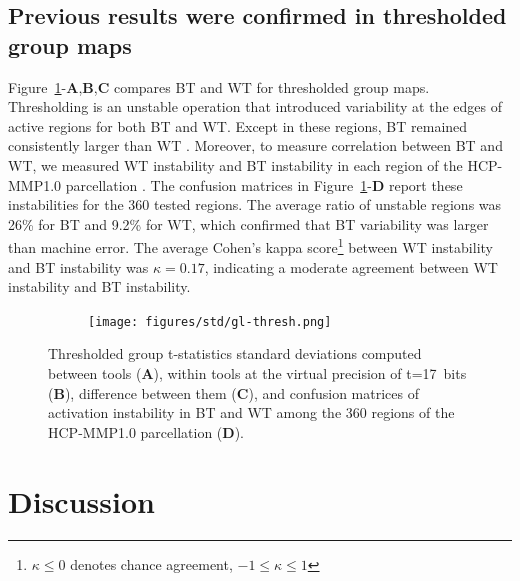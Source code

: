 \documentclass[11pt,onecolumn]{article}
\begin{document}
{\subsection{Previous results were confirmed in thresholded group maps}

Figure~\ref{fig:thresh-maps}-\textbf{A},\textbf{B},\textbf{C} compares BT
and WT for thresholded group maps. Thresholding is an unstable operation
that introduced variability at the edges of
active regions for both BT and WT. Except in these regions, BT remained consistently larger
than WT . Moreover, to measure correlation between BT and WT, we
measured WT instability and BT instability in each region of the
HCP-MMP1.0 parcellation . The confusion matrices in
Figure~\ref{fig:thresh-maps}-\textbf{D} report these instabilities for
the 360 tested regions. The average ratio of unstable regions was 26\%
for BT and 9.2\% for WT, which confirmed that BT variability was larger than machine error.
The average Cohen's kappa score\footnote{$\kappa \leq 0$ denotes chance agreement, $-1 \leq \kappa \leq 1$}
between WT instability and BT instability was $\kappa=0.17$, indicating
a moderate agreement between WT instability and BT instability.

\begin{figure}[ht]
  \begin{subfigure}[ht]{\textwidth}
    \centering
    \texttt{[image: figures/std/gl-thresh.png]}
  \end{subfigure}
  \centering
  \caption{Thresholded group t-statistics standard deviations computed between tools (\textbf{A}),
    within tools at the virtual precision of t=17~bits (\textbf{B}), difference between them (\textbf{C}), and
    confusion matrices of activation instability
    in BT and WT among the 360 regions of the HCP-MMP1.0 parcellation (\textbf{D}).}
  \label{fig:thresh-maps}
\end{figure}


\section{Discussion}

}
\end{document}
